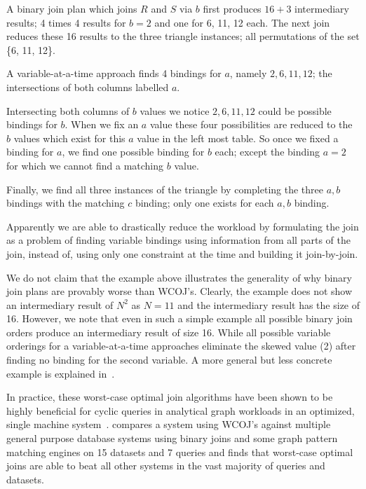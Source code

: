 A binary join plan which joins $R$ and $S$ via $b$ first produces $16 + 3$ intermediary results;
4 times 4 results for $b = 2$ and one for 6, 11, 12 each.
The next join reduces these 16 results to the three triangle instances; all permutations of the set \{6, 11, 12\}.

A variable-at-a-time approach finds 4 bindings for $a$, namely  $2, 6, 11, 12$;
the intersections of both columns labelled $a$.

Intersecting both columns of $b$ values we notice $2, 6, 11, 12$ could be possible bindings for $b$.
When we fix an $a$ value these four possibilities are reduced to the $b$ values which exist for this
$a$ value in the left most table.
So once we fixed a binding for $a$, we find one possible binding for $b$ each;
except the binding $a = 2$ for which we cannot find a matching $b$ value.

Finally, we find all three instances of the triangle by completing the three $a, b$ bindings with
the matching $c$ binding;
only one exists for each $a, b$ binding.

Apparently we are able to drastically reduce the workload by formulating the join as a problem of
finding variable bindings using information from all parts of the join, instead of, using only one constraint at the time
and building it join-by-join.

We do not claim that the example above illustrates the generality of why binary join plans are provably worse than
\textsc{WCOJ}'s.
Clearly, the example does not show an intermediary result of $N^2$ as $N = 11$ and the intermediary result has the size of 16.
However, we note that even in such a simple example all possible binary join orders produce an intermediary result of size 16.
While all possible variable orderings for a variable-at-a-time approaches eliminate the skewed value (2) after finding no binding
for the second variable.
A more general but less concrete example is explained in~\cite{skew-strikes-back}.

In practice, these worst-case optimal join algorithms have been shown to be highly beneficial for cyclic queries in analytical graph
workloads in an optimized, single machine system~\cite{leapfrog,olddog}.
\cite{olddog} compares a system using \textsc{WCOJ}'s against multiple general purpose database
systems using binary joins and some graph pattern matching engines on 15 datasets and 7 queries and
finds that worst-case optimal joins are able to beat all other systems in the vast majority of queries
and datasets.


